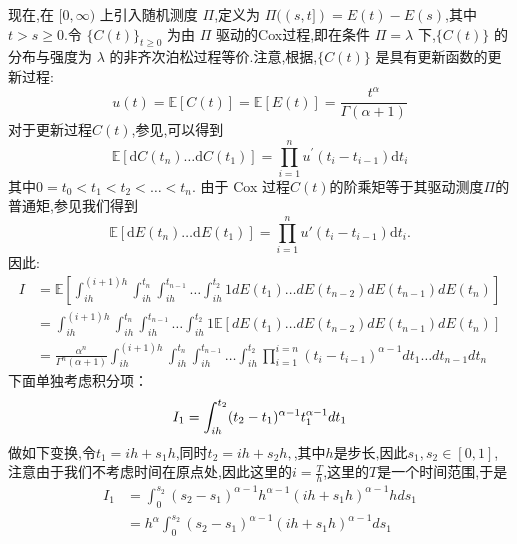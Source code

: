 \documentclass[12pt,final]{article}
\makeatletter
\theoremstyle{plain}
\renewcommand{\proofname}{Proof}
\theoremstyle{Definition}
\theoremstyle{Remark}
\renewenvironment{proof}[1][\proofname]{\par
	\pushQED{\qed}%
	\normalfont \topsep6\p@\@plus6\p@\relax
	\trivlist\item[\hskip\labelsep
	\bfseries #1\@addpunct{\,:\,}]\ignorespaces
}{%
	\popQED\endtrivlist\@endpefalse
}
\makeatother
\begin{document}
	
	\begin{proof}    
		现在,在 $[0, \infty)$ 上引入随机测度 $\Pi$,定义为 $\Pi((s, t]) = E(t) - E(s)$,其中 $t > s \geq 0$.令 $\{C(t)\}_{t \geq 0}$ 为由 $\Pi$ 驱动的Cox过程,即在条件 $\Pi = \lambda$ 下,$\{C(t)\}$ 的分布与强度为 $\lambda$ 的非齐次泊松过程等价.注意,根据\cite{kingman1964doubly},$\{C(t)\}$ 是具有更新函数的更新过程:
		\begin{equation}
			u(t) = \mathbb{E}[C(t)] = \mathbb{E}[E(t)] = \frac{t^\alpha}{\Gamma(\alpha+1)}
		\end{equation}
		对于更新过程$C(t)$,参见\cite{daley2003introduction},可以得到
		\begin{equation*}
			\mathbb{E}[\mathrm{d}C(t_n)\ldots\mathrm{d}C(t_1)] = \prod_{i=1}^n u^{\prime}(t_i - t_{i-1})\mathrm{d}t_i
		\end{equation*}
	    其中$0 = t_0 < t_1 < t_2 < \ldots <t_n$. 由于 Cox 过程$C(t)$的阶乘矩等于其驱动测度$\Pi$的普通矩,参见\cite{daley2003introduction}我们得到
		\begin{equation*}
			\mathbb{E}[\mathrm dE(t_n)\ldots\mathrm dE(t_1)]=\prod_{i=1}^nu'(t_i-t_{i-1})\mathrm dt_i.
		\end{equation*}
		因此:
		\begin{align*}
			I &= \mathbb{E}\left[\int_{ih}^{(i+1)h}
			\int_{ih}^{t_n}\int_{ih}^{t_{n-1}} \ldots \int_{ih}^{t_{2}} 1 dE(t_1) \ldots dE(t_{n-2})dE(t_{n-1})dE(t_n)\right] \\
			& = \int_{ih}^{(i+1)h}\int_{ih}^{t_n}\int_{ih}^{t_{n-1}}
			\ldots \int_{ih}^{t_{2}} 1 \mathbb{E}\left[dE(t_1) \ldots dE(t_{n-2})dE(t_{n-1})dE(t_n)\right] \\
			& = \frac{\alpha^n}{\Gamma^n(\alpha+1)}
			\int_{ih}^{(i+1)h}\int_{ih}^{t_n}\int_{ih}^{t_{n-1}} \ldots \int_{ih}^{t_{2}} \prod_{i=1}^{i=n}(t_i-t_{i-1})^{\alpha -1} dt_1 \ldots dt_{n-1}dt_n
		\end{align*}
		下面单独考虑积分项：
		\begin{equation*}
			I_{1}=\int_{ih}^{t_{2}} (t_{2}-t_1)^{\alpha -1} t_1^{\alpha - 1} dt_1 \\
		\end{equation*}
		做如下变换,令$t_{1} = ih + s_{1}h$,同时$t_2 = ih + s_2h ,$,其中$h$是步长,因此$s_1,s_{2} \in [0,1]$,注意由于我们不考虑时间在原点处,因此这里的$i=\frac{T}{h}$,这里的$T$是一个时间范围,于是
		\begin{align*}
			I_1 &= \int_{0}^{s_{2}} (s_{2}-s_{1})^{\alpha -1}h^{\alpha -1} (ih + s_1h)^{\alpha - 1}h ds_1 \\
			&= h^{\alpha}\int_{0}^{s_{2}} (s_{2}-s_{1})^{\alpha -1} (ih + s_1h)^{\alpha - 1} ds_1

\end{align*}
\end{proof}
\end{document}
